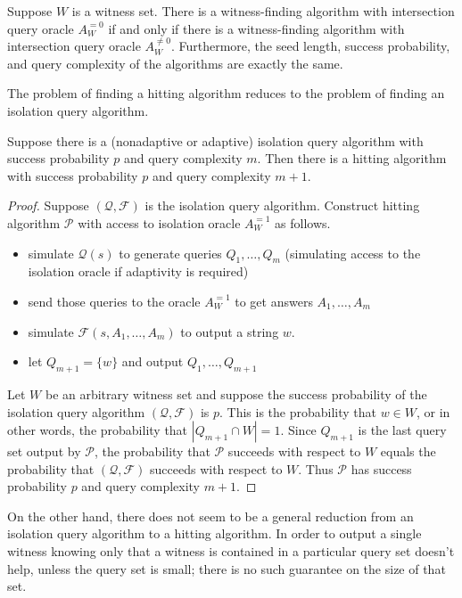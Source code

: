 \documentclass{article}
\newcommand{\mc}{\mathcal}
\begin{document}
\begin{corollary}\label{cor:flip}
  Suppose $W$ is a witness set.
  There is a witness-finding algorithm with intersection query oracle $A^{= 0}_W$ if and only if there is a witness-finding algorithm with intersection query oracle $A^{\neq 0}_W$.
  Furthermore, the seed length, success probability, and query complexity of the algorithms are exactly the same.
\end{corollary}

The problem of finding a hitting algorithm reduces to the problem of finding an isolation query algorithm.

\begin{lemma}\label{lem:reduction}
  Suppose there is a (nonadaptive or adaptive) isolation query algorithm with success probability $p$ and query complexity $m$.
  Then there is a hitting algorithm with success probability $p$ and query complexity $m + 1$.
\end{lemma}
\begin{proof}
  Suppose $(\mc{Q}, \mc{F})$ is the isolation query algorithm.
  Construct hitting algorithm $\mc{P}$ with access to isolation oracle $A^{=1}_W$ as follows.
  \begin{itemize}
  \item simulate $\mc{Q}(s)$ to generate queries $Q_1, \dotsc, Q_m$ (simulating access to the isolation oracle if adaptivity is required)
  \item send those queries to the oracle $A^{=1}_W$ to get answers $A_1, \dotsc, A_m$
  \item simulate $\mc{F}(s, A_1, \dotsc, A_m)$ to output a string $w$.
  \item let $Q_{m + 1} = \{ w \}$ and output $Q_1, \dotsc, Q_{m + 1}$
  \end{itemize}

  Let $W$ be an arbitrary witness set and suppose the success probability of the isolation query algorithm $(\mc{Q}, \mc{F})$ is $p$.
  This is the probability that $w \in W$, or in other words, the probability that $|Q_{m + 1} \cap W| = 1$.
  Since $Q_{m + 1}$ is the last query set output by $\mc{P}$, the probability that $\mc{P}$ succeeds with respect to $W$ equals the probability that $(\mc{Q}, \mc{F})$ succeeds with respect to $W$.
  Thus $\mc{P}$ has success probability $p$ and query complexity $m + 1$.
\end{proof}

On the other hand, there does not seem to be a general reduction from an isolation query algorithm to a hitting algorithm.
In order to output a single witness knowing only that a witness is contained in a particular query set doesn't help, unless the query set is small; there is no such guarantee on the size of that set.
\end{document}
